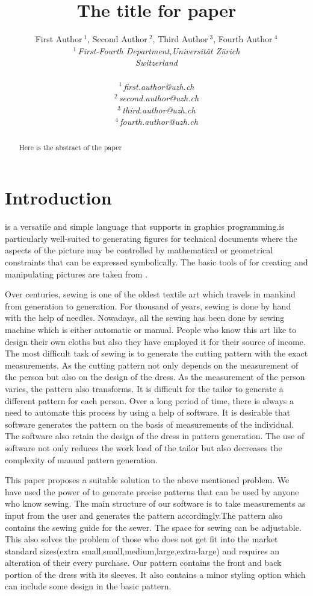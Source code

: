 \documentclass[10pt,letterpaper]{ltugboat}
\title{The title for paper}
\author{%
{First Author{\small $~^{1}$}, Second Author{\small $~^{2}$}, Third Author{\small $~^{3}$}, Fourth Author{\small $~^{4}$} }%
\vspace{1.6mm}\\
\fontsize{10}{10}\selectfont\itshape
$^{1}$\,First-Fourth Department,Universit{\"a}t Z{\"u}rich\\
Switzerland\\
\fontsize{9}{9}\selectfont\ttfamily\upshape
\\
$^{1}$\,first.author@uzh.ch\\
$^{2}$\,second.author@uzh.ch\\
$^{3}$\,third.author@uzh.ch\\
$^{4}$\,fourth.author@uzh.ch%
\vspace{1.2mm}\\
\fontsize{10}{10}\selectfont\rmfamily\itshape
}
\begin{document}
\maketitle
\lstset{language=MetaPost}
\begin{abstract} 
Here is the abstract of the paper
\end{abstract}

\section{Introduction}

\justifying \MP is a versatile and simple language that supports in graphics programming.\MP is particularly well-suited to generating figures for technical documents where the aspects of the picture may be controlled by mathematical or geometrical constraints that can be expressed symbolically. The basic tools of \MP for creating and manipulating pictures are taken from \MF .
\par Over centuries, sewing is one of the oldest textile art which travels in mankind from generation to generation. For thousand of years, sewing is done by hand with the help of needles. Nowadays, all the sewing has been done by sewing machine which is either automatic or manual. People who know this art like to design their own cloths but also they have employed it for their source of income. The most difficult task of sewing is to generate the cutting pattern with the exact measurements. As the cutting pattern not only depends on the measurement of the person but also on the design of the dress. As the measurement of the person varies, the pattern also transforms. It is difficult for the tailor to generate a different pattern for each person. Over a long period of time, there is always a need to automate this process by using a help of software. It is desirable that software generates the pattern on the basis of measurements of the individual. The software also retain the design of the dress in pattern generation. The use of software not only reduces the work load of the tailor but also decreases the complexity of manual pattern generation.
\par \justifying This paper proposes a suitable solution to the above mentioned problem. We have used the power of \MP to generate precise patterns that can be used by anyone who know sewing. The main structure of our software is to take measurements as input from the user and generates the pattern accordingly.The pattern also contains the sewing guide for the sewer. The space for sewing can be adjustable. This also solves the problem of those who does not get fit into the market standard sizes(extra small,small,medium,large,extra-large) and requires an alteration of their every purchase. Our pattern contains the front and back portion of the dress with its sleeves. It also contains a minor styling option which can include some design in the basic pattern.
\end{document}
